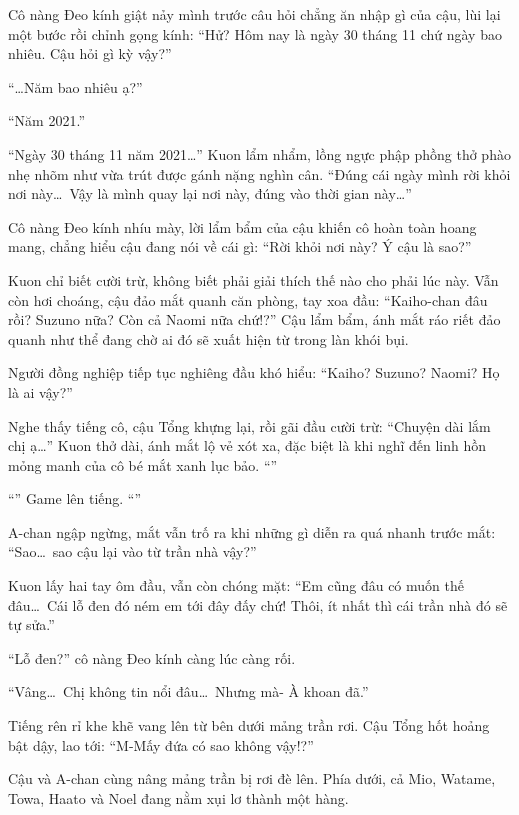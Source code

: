 \documentclass[../main.tex]{subfiles}
\begin{document}
Cô nàng Đeo kính giật nảy mình trước câu hỏi chẳng ăn nhập gì của cậu, lùi lại một bước rồi chỉnh gọng kính: ``Hử? Hôm nay là ngày 30 tháng 11 chứ ngày bao nhiêu. Cậu hỏi gì kỳ vậy?''

``\dots Năm bao nhiêu ạ?''

``Năm 2021.''

``Ngày 30 tháng 11 năm 2021\dots'' Kuon lẩm nhẩm, lồng ngực phập phồng thở phào nhẹ nhõm như vừa trút được gánh nặng nghìn cân. ``Đúng cái ngày mình rời khỏi nơi này\dots\ Vậy là mình quay lại nơi này, đúng vào thời gian này\dots''

Cô nàng Đeo kính nhíu mày, lời lẩm bẩm của cậu khiến cô hoàn toàn hoang mang, chẳng hiểu cậu đang nói về cái gì: ``Rời khỏi nơi này? Ý cậu là sao?''

Kuon chỉ biết cười trừ, không biết phải giải thích thế nào cho phải lúc này. Vẫn còn hơi choáng, cậu đảo mắt quanh căn phòng, tay xoa đầu: ``Kaiho-chan đâu rồi? Suzuno nữa? Còn cả Naomi nữa chứ!?'' Cậu lẩm bẩm, ánh mắt ráo riết đảo quanh như thể đang chờ ai đó sẽ xuất hiện từ trong làn khói bụi.

Người đồng nghiệp tiếp tục nghiêng đầu khó hiểu: ``Kaiho? Suzuno? Naomi? Họ là ai vậy?''

Nghe thấy tiếng cô, cậu Tổng khựng lại, rồi gãi đầu cười trừ: ``Chuyện dài lắm chị ạ\dots'' Kuon thở dài, ánh mắt lộ vẻ xót xa, đặc biệt là khi nghĩ đến linh hồn mỏng manh của cô bé mắt xanh lục bảo. ``''

``'' Game lên tiếng. ``''

A-chan ngập ngừng, mắt vẫn trố ra khi những gì diễn ra quá nhanh trước mắt: ``Sao\dots\ sao cậu lại vào từ trần nhà vậy?''

Kuon lấy hai tay ôm đầu, vẫn còn chóng mặt: ``Em cũng đâu có muốn thế đâu\dots\ Cái lỗ đen đó ném em tới đây đấy chứ! Thôi, ít nhất thì cái trần nhà đó sẽ tự sửa.''

``Lỗ đen?'' cô nàng Đeo kính càng lúc càng rối.

``Vâng\dots\ Chị không tin nổi đâu\dots\ Nhưng mà- À khoan đã.''

Tiếng rên rỉ khe khẽ vang lên từ bên dưới mảng trần rơi. Cậu Tổng hốt hoảng bật dậy, lao tới: ``M-Mấy đứa có sao không vậy!?''

Cậu và A-chan cùng nâng mảng trần bị rơi đè lên. Phía dưới, cả Mio, Watame, Towa, Haato và Noel đang nằm xụi lơ thành một hàng.
\end{document}

